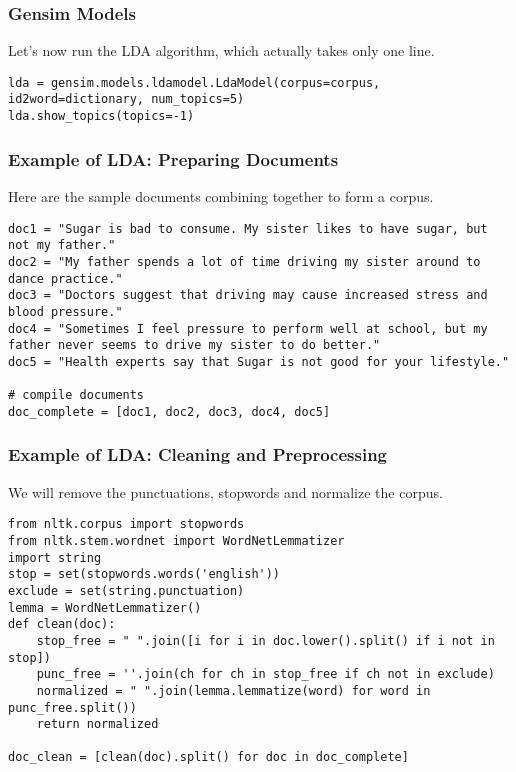 \begin{frame}[fragile]\frametitle{Gensim Models}
Let's now run the LDA algorithm, which actually takes only one line. 
\begin{lstlisting}
lda = gensim.models.ldamodel.LdaModel(corpus=corpus, id2word=dictionary, num_topics=5)
lda.show_topics(topics=-1)
\end{lstlisting}
\end{frame}

\begin{frame}[fragile]\frametitle{Example of LDA: Preparing Documents}
Here are the sample documents combining together to form a corpus.
\begin{lstlisting}
doc1 = "Sugar is bad to consume. My sister likes to have sugar, but not my father."
doc2 = "My father spends a lot of time driving my sister around to dance practice."
doc3 = "Doctors suggest that driving may cause increased stress and blood pressure."
doc4 = "Sometimes I feel pressure to perform well at school, but my father never seems to drive my sister to do better."
doc5 = "Health experts say that Sugar is not good for your lifestyle."

# compile documents
doc_complete = [doc1, doc2, doc3, doc4, doc5]
\end{lstlisting}
\end{frame}


\begin{frame}[fragile]\frametitle{Example of LDA: Cleaning and Preprocessing}
We will remove the punctuations, stopwords and normalize the corpus.
\begin{lstlisting}
from nltk.corpus import stopwords
from nltk.stem.wordnet import WordNetLemmatizer
import string
stop = set(stopwords.words('english'))
exclude = set(string.punctuation)
lemma = WordNetLemmatizer()
def clean(doc):
    stop_free = " ".join([i for i in doc.lower().split() if i not in stop])
    punc_free = ''.join(ch for ch in stop_free if ch not in exclude)
    normalized = " ".join(lemma.lemmatize(word) for word in punc_free.split())
    return normalized

doc_clean = [clean(doc).split() for doc in doc_complete] 
\end{lstlisting}
\end{frame}

